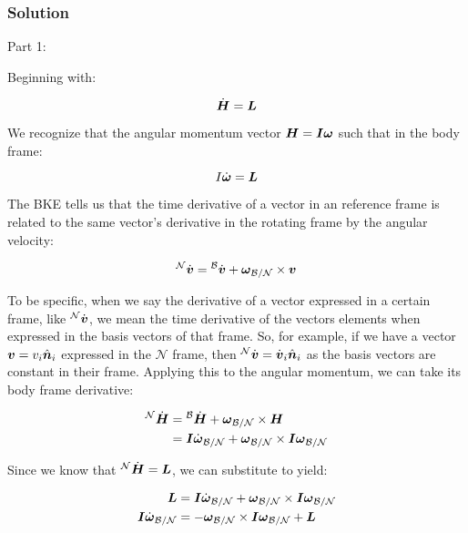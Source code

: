 \subsubsection{Solution}

Part 1: 

Beginning with:

\begin{equation}
    \dot{\boldsymbol{H}} = \boldsymbol{L}
\end{equation}

We recognize that the angular momentum vector $\boldsymbol{H} = \boldsymbol{I} \boldsymbol{\omega}$ such that in the body frame:

\begin{equation}
    I \dot{\boldsymbol{\omega}} = \boldsymbol{L}
\end{equation}

The BKE tells us that the time derivative of a vector in an reference frame is related to the same vector's derivative in the rotating frame by the angular velocity:

\begin{equation}
    {}^\mathcal{N}\dot{\boldsymbol{v}} = {}^\mathcal{B}\dot{\boldsymbol{v}} + \boldsymbol{\omega}_\mathcal{B/N} \times \boldsymbol{v}
\end{equation}

To be specific, when we say the derivative of a vector expressed in a certain frame, like ${}^\mathcal{N}\dot{\boldsymbol{v}}$, we mean the time derivative of the vectors elements when expressed in the basis vectors of that frame. So, for example, if we have a vector $\boldsymbol{v} = v_i \hat{\boldsymbol{n}}_i$ expressed in the $\mathcal{N}$ frame, then ${}^\mathcal{N}\dot{\boldsymbol{v}} = \dot{\boldsymbol{v}}_i \hat{\boldsymbol{n}}_i$ as the basis vectors are constant in their frame. Applying this to the angular momentum, we can take its body frame derivative:

\begin{align*}
    {}^\mathcal{N}\dot{\boldsymbol{H}} &= {}^\mathcal{B}\dot{\boldsymbol{H}} + \boldsymbol{\omega}_\mathcal{B/N} \times \boldsymbol{H} \\
    &= \boldsymbol{I} \dot{\boldsymbol{\omega}}_\mathcal{B/N} + \boldsymbol{\omega}_\mathcal{B/N} \times \boldsymbol{I} \boldsymbol{\omega}_\mathcal{B/N} \\
\end{align*}

Since we know that ${}^\mathcal{N}\dot{\boldsymbol{H}} = \boldsymbol{L}$, we can substitute to yield:

\begin{align*}
    \boldsymbol{L} &= \boldsymbol{I} \dot{\boldsymbol{\omega}}_\mathcal{B/N} + \boldsymbol{\omega}_\mathcal{B/N} \times \boldsymbol{I} \boldsymbol{\omega}_\mathcal{B/N} \\
    \boldsymbol{I} \dot{\boldsymbol{\omega}}_\mathcal{B/N} &= -\boldsymbol{\omega}_\mathcal{B/N} \times \boldsymbol{I} \boldsymbol{\omega}_\mathcal{B/N} + \boldsymbol{L} \\
\end{align*}

